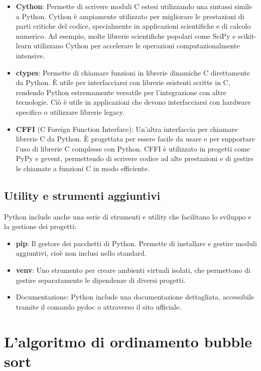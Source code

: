\documentclass[
  letterpaper,
]{scrbook}
\begin{document}
\begin{itemize}
\item
  \textbf{Cython}: Permette di scrivere moduli C estesi utilizzando una
  sintassi simile a Python. Cython è ampiamente utilizzato per
  migliorare le prestazioni di parti critiche del codice, specialmente
  in applicazioni scientifiche e di calcolo numerico. Ad esempio, molte
  librerie scientifiche popolari come SciPy e scikit-learn utilizzano
  Cython per accelerare le operazioni computazionalmente intensive.
\item
  \textbf{ctypes}: Permette di chiamare funzioni in librerie dinamiche C
  direttamente da Python. È utile per interfacciarsi con librerie
  esistenti scritte in C, rendendo Python estremamente versatile per
  l'integrazione con altre tecnologie. Ciò è utile in applicazioni che
  devono interfacciarsi con hardware specifico o utilizzare librerie
  legacy.
\item
  \textbf{CFFI} (C Foreign Function Interface): Un'altra interfaccia per
  chiamare librerie C da Python. È progettata per essere facile da usare
  e per supportare l'uso di librerie C complesse con Python. CFFI è
  utilizzato in progetti come PyPy e gevent, permettendo di scrivere
  codice ad alte prestazioni e di gestire le chiamate a funzioni C in
  modo efficiente.
\end{itemize}

\subsection{Utility e strumenti
aggiuntivi}\label{utility-e-strumenti-aggiuntivi}

Python include anche una serie di strumenti e utility che facilitano lo
sviluppo e la gestione dei progetti:

\begin{itemize}
\item
  \textbf{pip}: Il gestore dei pacchetti di Python. Permette di
  installare e gestire moduli aggiuntivi, cioè non inclusi nello
  standard.
\item
  \textbf{venv}: Uno strumento per creare ambienti virtuali isolati, che
  permettono di gestire separatamente le dipendenze di diversi progetti.
\item
  Documentazione: Python include una documentazione dettagliata,
  accessibile tramite il comando pydoc o attraverso il sito ufficiale.
\end{itemize}

\section{L'algoritmo di ordinamento bubble
sort}\label{lalgoritmo-di-ordinamento-bubble-sort}
\end{document}

